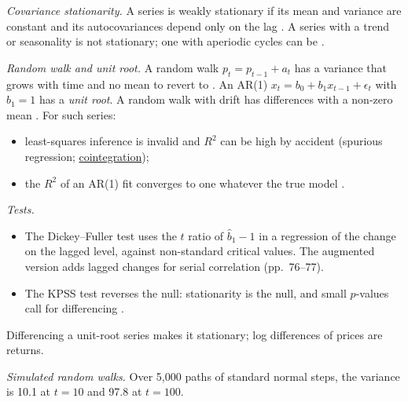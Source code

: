 \begin{qfdefinition}\label{def:stationarity-unit-roots}
 \emph{Covariance stationarity.} A series is weakly stationary if its mean and variance are constant and its autocovariances depend only on the lag \citep[pp.~30--31]{s7-tsay}. A series with a trend or seasonality is not stationary; one with aperiodic cycles can be \citep[sec.~9.1]{s7-hyndman}.

\emph{Random walk and unit root.} A random walk $p_t=p_{t-1}+a_t$ has a variance that grows with time and no mean to revert to \citep[p.~72]{s7-tsay}. An AR(1) $x_t=b_0+b_1x_{t-1}+\epsilon_t$ with $b_1=1$ has a \emph{unit root}. A random walk with drift has differences with a non-zero mean \citep[sec.~9.1]{s7-hyndman}. For such series:
\begin{itemize}
\item least-squares inference is invalid and $R^2$ can be high by accident (spurious regression; \hyperref[meth:cointegration-testing]{cointegration});
\item the $R^2$ of an AR(1) fit converges to one whatever the true model \citep[p.~54]{s7-tsay}.
\end{itemize}

\emph{Tests.}
\begin{itemize}
\item The Dickey--Fuller test uses the $t$ ratio of $\hat b_1-1$ in a regression of the change on the lagged level, against non-standard critical values. The augmented version adds lagged changes for serial correlation (pp.~76--77).
\item The KPSS test reverses the null: stationarity is the null, and small $p$-values call for differencing \citep[sec.~9.1]{s7-hyndman}.
\end{itemize}
Differencing a unit-root series makes it stationary; log differences of prices are returns.

 \emph{Simulated random walks.} Over 5,000 paths of standard normal steps, the variance is 10.1 at $t=10$ and 97.8 at $t=100$.


\end{qfdefinition}
